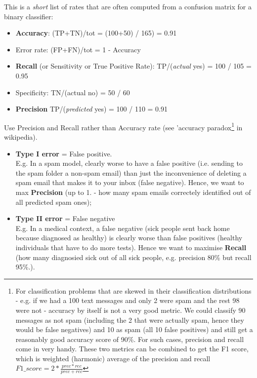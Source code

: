 \documentclass[12pt]{article}
\begin{document}
This is a \textit{short} list of rates that are often computed from a confusion matrix for a binary classifier:
\begin{itemize}
	\item \textbf{Accuracy}: (TP+TN)/tot = (100+50) / 165) = 0.91
	\item Error rate: (FP+FN)/tot = 1 - Accuracy
	\item \textbf{Recall} (or Sensitivity or True Positive Rate): TP/(\textit{actual} yes) = 100 / 105 = 0.95
	\item Specificity: TN/(actual no) = 50 / 60
	\item \textbf{Precision} TP/(\textit{predicted} yes) = 100 / 110 = 0.91
\end{itemize}
Use Precision and Recall rather than Accuracy rate (see 'accuracy paradox\footnote{For classification problems that are skewed in their classification distributions - e.g. if we had a 100 text messages and only 2 were spam and the rest 98 were not - accuracy by itself is not a very good metric. We could classify 90 messages as not spam (including the 2 that were actually spam, hence they would be false negatives) and 10 as spam (all 10 false positives) and still get a reasonably good accuracy score of 90\%. For such cases, precision and recall come in very handy. These two metrics can be combined to get the F1 score, which is weighted (harmonic) average of the precision and recall $F1\_score = 2 * \frac{prec * rec}{prec + rec}$} in wikipedia).

\begin{itemize}
	\item \textbf{Type I error} = False positive. \\ E.g. In a spam model, clearly worse to have a false positive (i.e. sending to the spam folder a non-spam email) than just the inconvenience of deleting a spam email that makes it to your inbox (false negative). Hence, we want to max \textbf{Precision} (up to 1. - how many spam emails correctely identified out of all predicted spam ones);
	\item \textbf{Type II error} = False negative \\ E.g. In a medical context, a false negative (sick people sent back home because diagnosed as healthy) is clearly worse than false positives (healthy individuals that have to do more tests). Hence we want to maximise \textbf{Recall} (how many diagnosied sick out of all sick people, e.g. precision 80\% but recall 95\%.).
\end{itemize}
\end{document}
